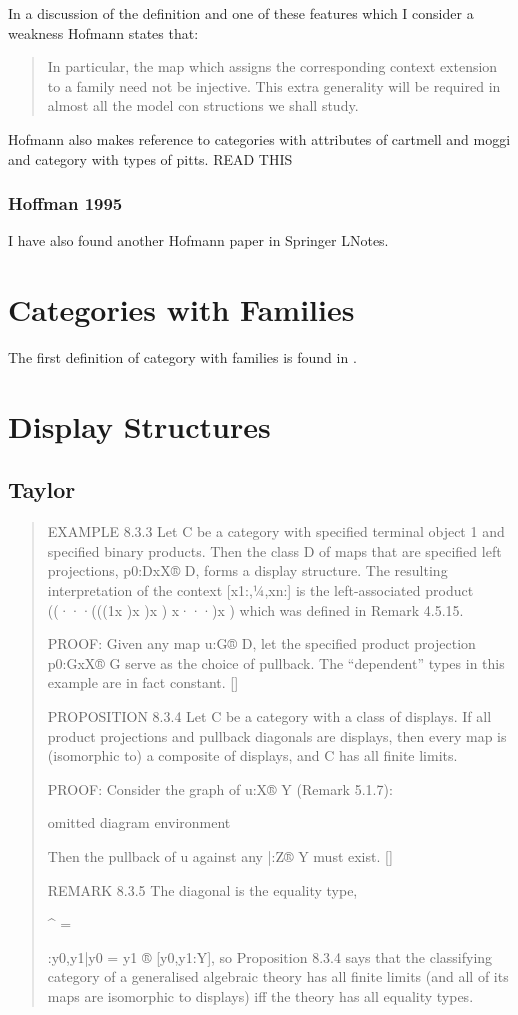 \documentclass[10pt,a4paper]{article}
\begin{document}
\noindent
In a discussion of the definition and one of these features which I consider a weakness Hofmann states that:
\begin{quote}
In particular, 
the map which assigns the corresponding context extension to a family need not 
be injective. This extra generality will be required in almost all the model con­ 
structions we shall study. 
\end{quote}

Hofmann also makes reference to categories with attributes of cartmell and moggi and category with types of pitts.
READ THIS 

\subsubsection{Hoffman 1995}
I have also found another Hofmann paper \cite{hofmann95} in Springer LNotes.

\section{Categories with Families}

The first definition of category with families is found in \cite{dybjer96}.

\section{Display Structures}
\subsection{Taylor}
\begin{quote}
EXAMPLE 8.3.3 Let C be a category with specified terminal object 1 and specified binary products. Then the class D of maps that are specified left projections, p0:DxX® D, forms a display structure. The resulting interpretation of the context [x1:,¼,xn:\typeXn] is the left-associated product ((···(((1x )x )x ) x···)x \typeXn) which was defined in Remark 4.5.15.

PROOF: Given any map u:G® D, let the specified product projection p0:GxX® G serve as the choice of pullback. The ``dependent'' types in this example are in fact constant. []

PROPOSITION 8.3.4 Let C be a category with a class of displays. If all product projections and pullback diagonals are displays, then every map is (isomorphic to) a composite of displays, and C has all finite limits.

PROOF: Consider the graph of u:X® Y (Remark  5.1.7):

omitted diagram environment

Then the pullback of u against any |:Z® Y must exist. []

REMARK 8.3.5 The diagonal is the equality type,

^
= 
 
:{y0,y1|y0 = y1} ® [y0,y1:Y],
so Proposition 8.3.4 says that the classifying category of a generalised algebraic theory has all finite limits (and all of its maps are isomorphic to displays) iff the theory has all equality types.
\end{quote}
  

\end{document}
